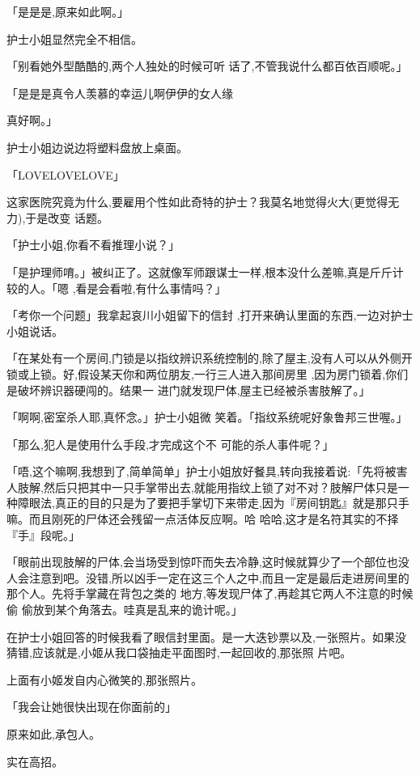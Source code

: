 \documentclass{article}
\begin{document}
「是是是,原来如此啊。」 


护士小姐显然完全不相信。 

「别看她外型酷酷的,两个人独处的时候可听
话了,不管我说什么都百依百顺呢。」 

「是是是真令人羡慕的幸运儿啊伊伊的女人缘

\newpage
真好啊。」 


护士小姐边说边将塑料盘放上桌面。 


「LOVELOVELOVE」 

这家医院究竟为什么,要雇用个性如此奇特的护士？我莫名地觉得火大(更觉得无力),于是改变
话题。 


「护士小姐,你看不看推理小说？」 

「是护理师唷。」被纠正了。这就像军师跟谋士一样,根本没什么差嘛,真是斤斤计较的人。「嗯
,看是会看啦,有什么事情吗？」 

「考你一个问题」我拿起哀川小姐留下的信封
,打开来确认里面的东西,一边对护士小姐说话。 

「在某处有一个房间,门锁是以指纹辨识系统控制的,除了屋主,没有人可以从外侧开锁或上锁。好,假设某天你和两位朋友,一行三人进入那间房里
\newpage
,因为房门锁着,你们是破坏辨识器硬闯的。结果一
进门就发现尸体,屋主已经被杀害肢解了。」 

「啊啊,密室杀人耶,真怀念。」护士小姐微
笑着。「指纹系统呢好象鲁邦三世喔。」 

「那么,犯人是使用什么手段,才完成这个不
可能的杀人事件呢？」 

「唔,这个嘛啊,我想到了,简单简单」护士小姐放好餐具,转向我接着说:「先将被害人肢解,然后只把其中一只手掌带出去,就能用指纹上锁了对不对？肢解尸体只是一种障眼法,真正的目的只是为了要把手掌切下来带走,因为『房间钥匙』就是那只手嘛。而且刚死的尸体还会残留一点活体反应啊。哈
哈哈,这才是名符其实的不择『手』段呢。」 

「眼前出现肢解的尸体,会当场受到惊吓而失去冷静,这时候就算少了一个部位也没人会注意到吧。没错,所以凶手一定在这三个人之中,而且一定是最后走进房间里的那个人。先将手掌藏在背包之类的
\newpage
地方,等发现尸体了,再趁其它两人不注意的时候偷
偷放到某个角落去。哇真是乱来的诡计呢。」 


在护士小姐回答的时候我看了眼信封里面。是一大迭钞票以及,一张照片。如果没猜错,应该就是,小姬从我口袋抽走平面图时,一起回收的,那张照
片吧。 


上面有小姬发自内心微笑的,那张照片。 


「我会让她很快出现在你面前的」 


原来如此,承包人。 


实在高招。 
\end{document}
